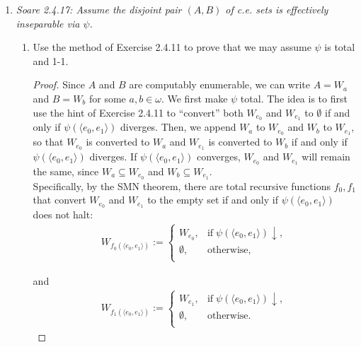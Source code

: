 \documentclass{article}
\begin{document}
\begin{enumerate}[label={\bf Q\arabic*:}]
\begin{proof}
      Once again, we can construct $g$ via the SMN theorem, by first
      constructing another function $\varphi_{g(e)}(x)$ that outputs
      0 if $x\in\text{range}(\varphi_e)$ and that does not halt otherwise.
    \end{proof}

  \item \it Soare 2.4.17: Assume the disjoint pair $(A,B)$ of c.e. sets is
    effectively inseparable via $\psi$.
    \begin{enumerate}[label={(\roman*)}]
      \item Use the method of Exercise 2.4.11 to prove that we may assume
        $\psi$ is total and 1-1.

        \begin{proof}
          Since $A$ and $B$ are computably enumerable, we can write $A=W_a$
          and $B=W_b$ for some $a,b\in\omega$. We first make $\psi$ total.
          The idea is to first use the hint of Exercise 2.4.11 to
          ``convert'' both $W_{e_0}$ and $W_{e_1}$ to $\emptyset$ if and
          only if $\psi(\langle e_0,e_1\rangle)$ diverges. Then, we append
          $W_a$ to $W_{e_0}$ and $W_b$ to $W_{e_1}$, so that $W_{e_0}$ is
          converted to $W_a$ and $W_{e_1}$ is converted to $W_b$ if and
          only if $\psi(\langle e_0,e_1\rangle)$ diverges. If $\psi(\langle
          e_0,e_1\rangle)$ converges, $W_{e_0}$ and $W_{e_1}$ will remain
          the same, since $W_a\subseteq W_{e_0}$ and $W_b\subseteq
          W_{e_1}$. \\

          Specifically, by the SMN theorem, there are total recursive
          functions $f_0,f_1$ that convert $W_{e_0}$ and $W_{e_1}$ to the
          empty set if and only if $\psi(\langle e_0,e_1\rangle)$ does not
          halt:
          \begin{align*}
            W_{f_0(\langle e_0,e_1\rangle)} :=
            \begin{cases}
              W_{e_0}, &\text{if}\; \psi(\langle e_0,e_1\rangle)\downarrow,\\
              \emptyset, &\text{otherwise},\\
            \end{cases}
          \end{align*}

          and
          \begin{align*}
            W_{f_1(\langle e_0,e_1\rangle)} :=
            \begin{cases}
              W_{e_1}, &\text{if}\; \psi(\langle e_0,e_1\rangle)\downarrow,\\
              \emptyset, &\text{otherwise}.\\
            \end{cases}
          \end{align*}


\end{proof}
\end{enumerate}
\end{enumerate}
\end{document}
